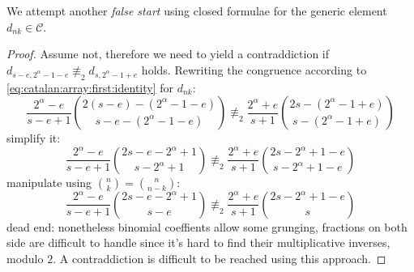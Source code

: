 We attempt another \emph{false start} using closed formulae for
the generic element $d_{nk}\in\mathcal{C}$.
\begin{proof}
Assume not, therefore we need to yield a contraddiction if
    $d_{s-e,2^{{\alpha}}-1-e} \not\equiv_{2} d_{s,2^{{\alpha}}-1+e}$
holds. Rewriting the congruence according to \autoref{eq:catalan:array:first:identity}
 for $d_{nk}$:
\begin{displaymath}
    \frac{2^{{\alpha}}-e}{s-e+1}{{2(s-e)-(2^{{\alpha}}-1-e)}\choose{s-e-(2^{{\alpha}}-1-e)}}
    \not\equiv_{2}
    \frac{2^{{\alpha}}+e}{s+1}{{2s-(2^{{\alpha}}-1+e)}\choose{s-(2^{{\alpha}}-1+e)}}
\end{displaymath}
simplify it:
\begin{displaymath}
    \frac{2^{{\alpha}}-e}{s-e+1}{{2s-e-2^{{\alpha}}+1}\choose{s-2^{{\alpha}}+1}}
    \not\equiv_{2}
    \frac{2^{{\alpha}}+e}{s+1}{{2s-2^{{\alpha}}+1-e}\choose{s-2^{{\alpha}}+1-e}}
\end{displaymath}
manipulate using ${{n}\choose{k}}={{n}\choose{n-k}}$:
\begin{displaymath}
    \frac{2^{{\alpha}}-e}{s-e+1}{{2s-e-2^{{\alpha}}+1}\choose{s-e}}
    \not\equiv_{2}
    \frac{2^{{\alpha}}+e}{s+1}{{2s-2^{{\alpha}}+1-e}\choose{s}}
\end{displaymath}
dead end: nonetheless binomial coeffients allow some grunging,
fractions on both side are difficult to handle since it's hard
to find their multiplicative inverses, modulo $2$. A contraddiction
is difficult to be reached using this approach.
\end{proof} 

